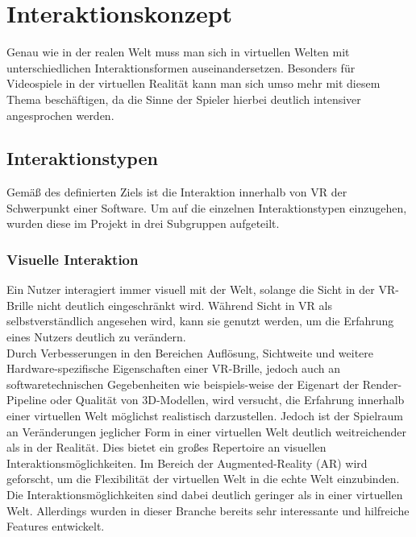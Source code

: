 \chapter{Interaktionskonzept}
Genau wie in der realen Welt muss man sich in virtuellen Welten mit unterschiedlichen Interaktionsformen auseinandersetzen. Besonders für Videospiele in der virtuellen Realität kann man sich umso mehr mit diesem Thema beschäftigen, da die Sinne der Spieler hierbei deutlich intensiver angesprochen werden.
\section{Interaktionstypen}
Gemäß des definierten Ziels ist die Interaktion innerhalb von VR der Schwerpunkt einer Software. Um auf die einzelnen Interaktionstypen einzugehen, wurden diese im Projekt in drei Subgruppen aufgeteilt.

\subsection{Visuelle Interaktion}
Ein Nutzer interagiert immer visuell mit der Welt, solange die Sicht in der VR-Brille nicht deutlich eingeschränkt wird. Während Sicht in VR als selbstverständlich angesehen wird, kann sie genutzt werden, um die Erfahrung eines Nutzers deutlich zu verändern.\\
\noindent Durch Verbesserungen in den Bereichen Auflösung, Sichtweite und weitere Hardware-spezifische Eigenschaften einer VR-Brille, jedoch auch an softwaretechnischen Gegebenheiten wie beispiels-weise der Eigenart der Render-Pipeline oder Qualität von 3D-Modellen, wird versucht, die Erfahrung innerhalb einer virtuellen Welt möglichst realistisch darzustellen. Jedoch ist der Spielraum an Veränderungen jeglicher Form in einer virtuellen Welt deutlich weitreichender als in der Realität. Dies bietet ein großes Repertoire an visuellen Interaktionsmöglichkeiten. Im Bereich der Augmented-Reality (AR) wird geforscht, um die Flexibilität der virtuellen Welt in die echte Welt einzubinden. Die Interaktionsmöglichkeiten sind dabei deutlich geringer als in einer virtuellen Welt. Allerdings wurden in dieser Branche bereits sehr interessante und hilfreiche Features entwickelt.

